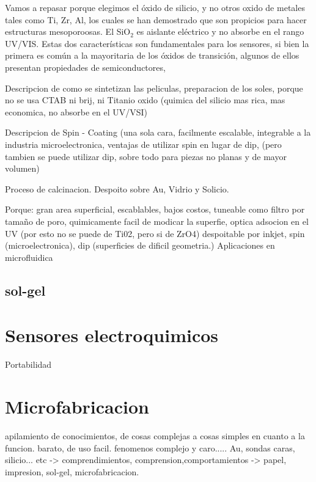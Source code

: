 				Vamos a repasar porque elegimos el óxido de silicio, y no otros oxido de metales tales como Ti, Zr, Al, los cuales se han demostrado que son propicios para hacer estructuras mesoporoosas. El SiO$_2$ es aislante eléctrico y no absorbe en el rango UV/VIS. Estas dos características son fundamentales para los sensores, si bien la primera es común a la mayoritaria de los óxidos de transición, algunos de ellos presentan propiedades de semiconductores, 

				Descripcion de como se sintetizan las peliculas, preparacion de los soles, porque no se usa CTAB ni brij, ni Titanio oxido (quimica del silicio mas rica, mas economica, no absorbe en el UV/VSI)

				Descripcion de Spin - Coating (una sola cara, facilmente escalable, integrable a la industria microelectronica, ventajas de utilizar spin en lugar de dip, (pero tambien se puede utilizar dip, sobre todo para piezas no planas y de mayor volumen)

				Proceso de calcinacion. Despoito sobre Au, Vidrio y Solicio.

				Porque: gran area superficial, escablables, bajos costos, tuneable como filtro por tamaño de poro, quimicamente facil de modicar la superfie, optica adsocion en el UV (por esto no se puede de Ti02, pero si de ZrO4) despoitable por inkjet\cite{Lian2013,Mougenot2006a}, spin (microelectronica), dip (superficies de dificil geometria.)
				Aplicaciones en microfluidica \cite{schmuhl2005,Martinez2009}
				
	\subsection{sol-gel}	

\section{Sensores electroquimicos}

Portabilidad

\section{Microfabricacion}\label{sec:microfabricacion}
apilamiento de conocimientos, de cosas complejas a cosas simples en cuanto a la funcion. barato, de uso facil.
fenomenos complejo y caro..... Au, sondas caras, silicio... etc -> comprendimientos, comprension,comportamientos -> papel, impresion, sol-gel, \cite{Whitesides2015,Burdass2010}microfabricacion.

